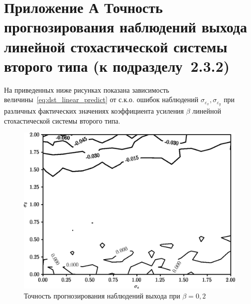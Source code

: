 \renewcommand{\thefigure}{\Asbuk{section}.\arabic{figure}}
\renewcommand{\thetable}{\Asbuk{section}.\arabic{table}}
\renewcommand{\thelstlisting}{\Asbuk{section}.\arabic{lstlisting}}

\chapter*{%
  Приложение А \hspace{10cm}
  Точность прогнозирования наблюдений выхода
  линейной стохастической  \hspace{10cm}
  системы второго типа \hspace{12cm}
  (к подразделу~2.3.2)
}

\setcounter{section}{1}
\setcounter{figure}{0}
\setcounter{table}{0}
\setcounter{lstlisting}{0}

На приведенных ниже рисунках показана зависимость величины~\eqref{eq:dst_linear_predict}
от с.к.о. ошибок наблюдений \( \sigma_{\varepsilon_x}, \sigma_{\varepsilon_y} \) при
различных фактических значениях коэффициента усиления \( \beta \)
линейной стохастической системы второго типа.

\begin{figure}[h]
  \centering
  \includegraphics[width=135mm]{fig/linear/predict/beta-0,2_predict-measured.png}
  \caption{Точность прогнозирования наблюдений выхода при \( \beta = 0{,}2 \)}
\end{figure}

